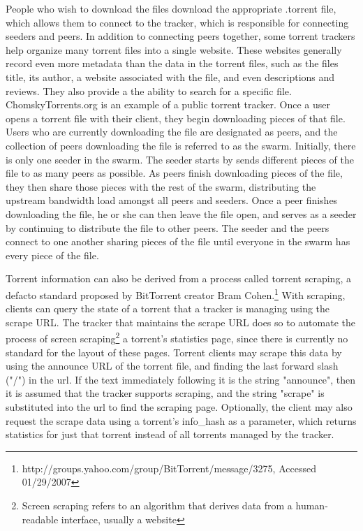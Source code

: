 \documentclass[a4paper,12pt]{report}
\begin{document}
People who wish to download the files download the appropriate .torrent file, which allows them to connect to the tracker, which is responsible for connecting seeders and peers.
In addition to connecting peers together, some torrent trackers help organize many torrent files into a single website. These websites generally record even more metadata than the data in the torrent files, such as the files title, its author, a website associated with the file, and even descriptions and reviews.
They also provide a the ability to search for a specific file. ChomskyTorrents.org is an example of a public torrent tracker.
Once a user opens a torrent file with their client, they begin downloading pieces of that file.
Users who are currently downloading the file are designated as peers, and the collection of peers downloading the file is referred to as the swarm.
Initially, there is only one seeder in the swarm.
The seeder starts by sends different pieces of the file to as many peers as possible. 
As peers finish downloading pieces of the file, they then share those pieces with the rest of the swarm, distributing the upstream bandwidth load amongst all peers and seeders. 
Once a peer finishes downloading the file, he or she can then leave the file open, and serves as a seeder by continuing to distribute the file to other peers.
The seeder and the peers connect to one another sharing pieces of the file until everyone in the swarm has every piece of the file.

Torrent information can also be derived from a process called torrent scraping, a defacto standard proposed by BitTorrent creator Bram Cohen.\footnote{http://groups.yahoo.com/group/BitTorrent/message/3275, Accessed 01/29/2007}
With scraping, clients can query the state of a torrent that a tracker is managing using the scrape URL. 
The tracker that maintains the scrape URL does so to automate the process of screen scraping\footnote{Screen scraping refers to an algorithm that derives data from a human-readable interface, usually a website} a torrent's statistics page, since there is currently no standard for the layout of these pages. 
Torrent clients may scrape this data by using the announce URL of the torrent file, and finding the last forward slash ("/") in the url. 
If the text immediately following it is the string "announce", then it is assumed that the tracker supports scraping, and the string "scrape" is substituted into the url to find the scraping page. 
Optionally, the client may also request the scrape data using a torrent's info_hash as a parameter, which returns statistics for just that torrent instead of all torrents managed by the tracker. 
\end{document}
